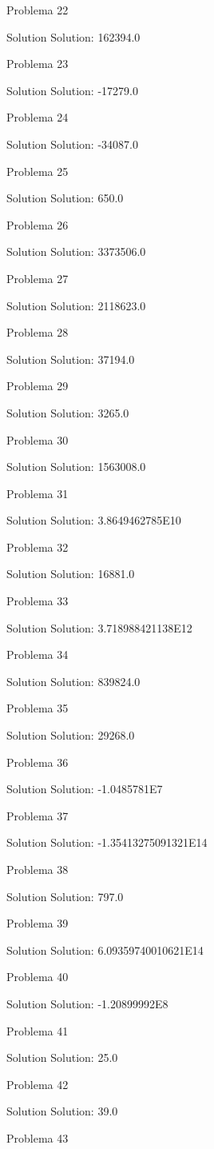 \documentclass{article}
\begin{document}
Problema 22

Solution Solution: 162394.0

Problema 23

Solution Solution: -17279.0

Problema 24

Solution Solution: -34087.0

Problema 25

Solution Solution: 650.0

Problema 26

Solution Solution: 3373506.0

Problema 27

Solution Solution: 2118623.0

Problema 28

Solution Solution: 37194.0

Problema 29

Solution Solution: 3265.0

Problema 30

Solution Solution: 1563008.0

Problema 31

Solution Solution: 3.8649462785E10

Problema 32

Solution Solution: 16881.0

Problema 33

Solution Solution: 3.718988421138E12

Problema 34

Solution Solution: 839824.0

Problema 35

Solution Solution: 29268.0

Problema 36

Solution Solution: -1.0485781E7

Problema 37

Solution Solution: -1.35413275091321E14

Problema 38

Solution Solution: 797.0

Problema 39

Solution Solution: 6.09359740010621E14

Problema 40

Solution Solution: -1.20899992E8

Problema 41

Solution Solution: 25.0

Problema 42

Solution Solution: 39.0

Problema 43
\end{document}
